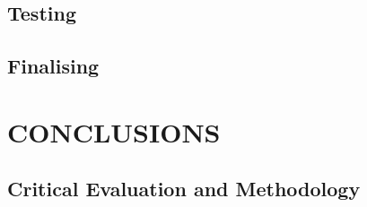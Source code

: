 \documentclass[a4paper, 10pt]{article}
\begin{document}

\subsection{Testing}

%
%


\subsection{Finalising}

%

\clearpage
\section{CONCLUSIONS}

\subsection{Critical Evaluation and Methodology}

%
\end{document}
